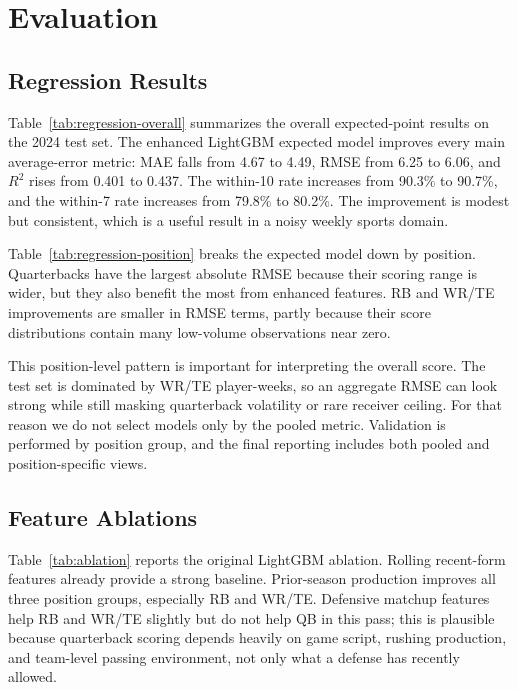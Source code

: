 \documentclass{article}
\begin{document}
\section{Evaluation}
\subsection{Regression Results}
Table~\ref{tab:regression-overall} summarizes the overall expected-point results on the 2024 test set. The enhanced LightGBM expected model improves every main average-error metric: MAE falls from 4.67 to 4.49, RMSE from 6.25 to 6.06, and $R^2$ rises from 0.401 to 0.437. The within-10 rate increases from 90.3\% to 90.7\%, and the within-7 rate increases from 79.8\% to 80.2\%. The improvement is modest but consistent, which is a useful result in a noisy weekly sports domain.





Table~\ref{tab:regression-position} breaks the expected model down by position. Quarterbacks have the largest absolute RMSE because their scoring range is wider, but they also benefit the most from enhanced features. RB and WR/TE improvements are smaller in RMSE terms, partly because their score distributions contain many low-volume observations near zero.



This position-level pattern is important for interpreting the overall score. The test set is dominated by WR/TE player-weeks, so an aggregate RMSE can look strong while still masking quarterback volatility or rare receiver ceiling. For that reason we do not select models only by the pooled metric. Validation is performed by position group, and the final reporting includes both pooled and position-specific views.

\subsection{Feature Ablations}
Table~\ref{tab:ablation} reports the original LightGBM ablation. Rolling recent-form features already provide a strong baseline. Prior-season production improves all three position groups, especially RB and WR/TE. Defensive matchup features help RB and WR/TE slightly but do not help QB in this pass; this is plausible because quarterback scoring depends heavily on game script, rushing production, and team-level passing environment, not only what a defense has recently allowed.
\end{document}
